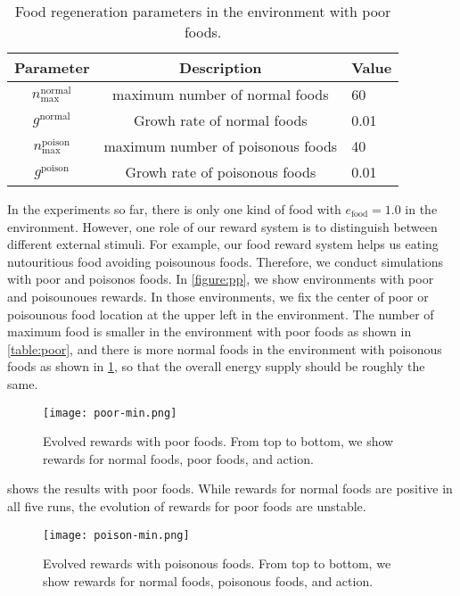 \begin{table}[t]
  \begin{tabular}{ccl}
    \toprule
    Parameter & Description & Value \\
    \midrule
    $n_{\textrm{max}}^{\textrm{normal}}$ & maximum number of normal foods & 60\\
    $g^{\textrm{normal}}$ & Growh rate of normal foods & 0.01 \\
    $n_{\textrm{max}}^{\textrm{poison}}$ & maximum number of poisonous foods & 40 \\
    $g^{\textrm{poison}}$ & Growh rate of poisonous foods & 0.01 \\
    \bottomrule
  \end{tabular}
  \caption{Food regeneration parameters in the environment with poor foods.}\label{table:poison}
\end{table}

In the experiments so far, there is only one kind of food with $e_{\mathrm{food}} = 1.0$ in the environment. However, one role of our reward system is to distinguish between different external stimuli. For example, our food reward system helps us eating nutouritious food avoiding poisounous foods. Therefore, we conduct simulations with poor and poisonos foods. In \cref{figure:pp}, we show environments with poor and poisounoues rewards. In those environments, we fix the center of poor or poisounous food location at the upper left in the environment. The number of maximum food is smaller in the environment with poor foods as shown in \cref{table:poor}, and there is more normal foods in the environment with poisonous foods as shown in \cref{table:poison}, so that the overall energy supply should be roughly the same.

\begin{figure}[t]
  \centering
  \texttt{[image: poor-min.png]}
  \caption{
    Evolved rewards with poor foods.
    From top to bottom, we show rewards for normal foods, poor foods, and action.
  }\label{figure:result-poor}
\end{figure}

 shows the results with poor foods. While rewards for normal foods are positive in all five runs, the evolution of rewards for poor foods are unstable.

\begin{figure}[t]
  \centering
  \texttt{[image: poison-min.png]}
  \caption{
    Evolved rewards with poisonous foods.
    From top to bottom, we show rewards for normal foods, poisonous foods, and action.
  }\label{figure:result-poor}
\end{figure}


